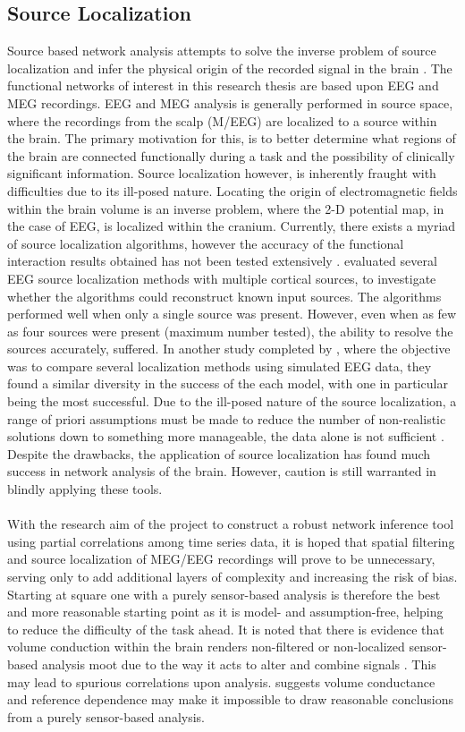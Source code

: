 \documentclass[11pt]{article}
\begin{document}
\subsection{Source Localization}
Source based network analysis attempts to solve the inverse problem of source localization and infer the physical origin of the recorded signal in the brain \citep{revbull}. The functional networks of interest in this research thesis are based upon EEG and MEG recordings. EEG and MEG analysis is generally performed in source space, where the recordings from the scalp (M/EEG) are localized to a source within the brain. The primary motivation for this, is to better determine what regions of the brain are connected functionally during a task and the possibility of clinically significant information. Source localization however, is inherently fraught with difficulties due to its ill-posed nature. Locating the origin of electromagnetic fields within the brain volume is an inverse problem, where the 2-D potential map, in the case of EEG, is localized within the cranium. Currently, there exists a myriad of source localization algorithms, however the accuracy of the functional interaction results obtained has not been tested extensively \citep{yao}.  \citet{bradsl} evaluated several EEG source localization methods with multiple cortical sources, to investigate whether the algorithms could reconstruct known input sources. The algorithms performed well when only a single source was present. However, even when as few as four sources were present (maximum number tested), the ability to resolve the sources accurately, suffered. In another study completed by \citet{yao}, where the objective was to compare several localization methods using simulated EEG data, they found a similar diversity in the success of the each model, with one in particular being the most successful. Due to the ill-posed nature of the source localization, a range of priori assumptions must be made to reduce the number of non-realistic solutions down to something more manageable, the data alone is not sufficient \citep{wagner}. Despite the drawbacks, the application of source localization has found much success in network analysis of the brain. However, caution is still warranted in blindly applying these tools.\\
\\
With the research aim of the project to construct a robust network inference tool using partial correlations among time series data, it is hoped that spatial filtering and source localization of MEG/EEG recordings will prove to be unnecessary, serving only to add additional layers of complexity and increasing the risk of bias. Starting at square one with a purely sensor-based analysis is therefore the best and more reasonable starting point as it is model- and assumption-free, helping to reduce the difficulty of the task ahead. It is noted that there is evidence that volume conduction within the brain renders non-filtered or non-localized sensor-based analysis moot due to the way it acts to alter and combine signals \citep{sens2}. This may lead to spurious correlations upon analysis. \citet{sens1} suggests volume conductance and reference dependence may make it impossible to draw reasonable conclusions from a purely sensor-based analysis.\\
\end{document}
